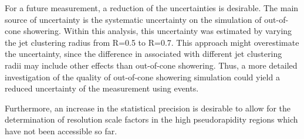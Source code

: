 For a future measurement, a reduction of the uncertainties is desirable.
The main source of uncertainty is the systematic uncertainty on the simulation of out-of-cone showering.
Within this analysis, this uncertainty was estimated by varying the jet clustering radius from R=0.5 to R=0.7.
This approach might overestimate the uncertainty, since the difference in \rhores associated with different jet clustering radii may include other effects than out-of-cone showering.
Thus, a more detailed investigation of the quality of out-of-cone showering simulation could yield a reduced uncertainty of the \rhores measurement using \GAMJET events.

Furthermore, an increase in the statistical precision is desirable to allow for the determination of resolution scale factors in the high pseudorapidity regions which have not been accessible so far.



